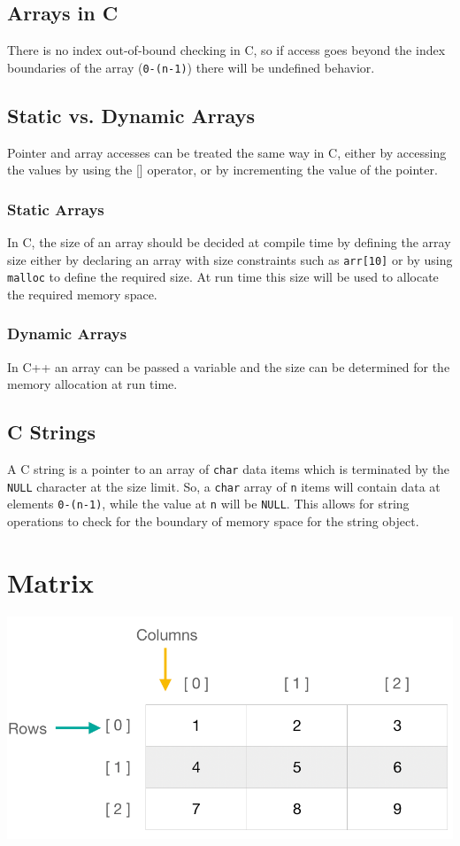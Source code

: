 \documentclass[11pt]{article}
\begin{document}
\subsection{Arrays in C}
There is no index out-of-bound checking in C, so if access goes beyond the index boundaries of the array (\texttt{0-(n-1)}) there will be undefined behavior.
\subsection{Static vs. Dynamic Arrays}
Pointer and array accesses can be treated the same way in C, either by accessing the values by using the [] operator, or by incrementing the value of the pointer. 
\subsubsection{Static Arrays}
In C, the size of an array should be decided at compile time by defining the array size either by declaring an array with size constraints such as \texttt{arr[10]} or by using \texttt{malloc} to define the required size. At run time this size will be used to allocate the required memory space.
\subsubsection{Dynamic Arrays}
In C++ an array can be passed a variable and the size can be determined for the memory allocation at run time.
\subsection{C Strings}
A C string is a pointer to an array of \texttt{char} data items which is terminated by the \texttt{NULL} character at the size limit. So, a \texttt{char} array of \texttt{n} items will contain data at elements \texttt{0-(n-1)}, while the value at \texttt{n} will be \texttt{NULL}. This allows for string operations to check for the boundary of memory space for the string object.
\section{Matrix}
\begin{center}
    \includegraphics[width=250 px]{img/matrix}  \\
\end{center}
\end{document}
